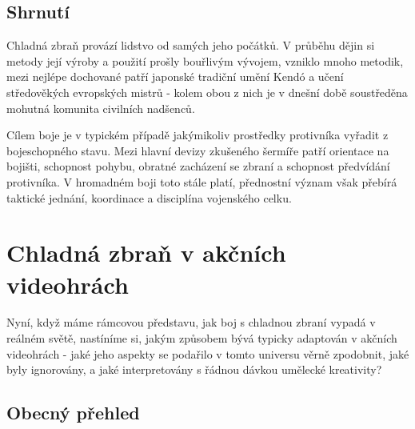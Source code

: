 \subsection{Shrnutí}
Chladná zbraň provází lidstvo od samých jeho počátků. V průběhu dějin si metody její výroby a použití prošly bouřlivým vývojem, vzniklo mnoho metodik, mezi nejlépe dochované patří japonské tradiční umění Kendó a učení středověkých evropských mistrů - kolem obou z nich je v dnešní době soustředěna mohutná komunita civilních nadšenců.

Cílem boje je v typickém případě jakýmikoliv prostředky protivníka vyřadit z bojeschopného stavu. Mezi hlavní devizy zkušeného šermíře patří orientace na bojišti, schopnost pohybu, obratné zacházení se zbraní a schopnost předvídání protivníka. V hromadném boji toto stále platí, přednostní význam však přebírá taktické jednání, koordinace a disciplína vojenského celku.

\clearpage


\section{Chladná zbraň v akčních videohrách}

Nyní, když máme rámcovou představu, jak boj s chladnou zbraní vypadá v reálném světě, nastíníme si, jakým způsobem bývá typicky adaptován v akčních videohrách - jaké jeho aspekty se podařilo v tomto universu věrně zpodobnit, jaké byly ignorovány, a jaké interpretovány s řádnou dávkou umělecké kreativity?

\subsection{Obecný přehled} \label{weaponInVideogamesBasics}

